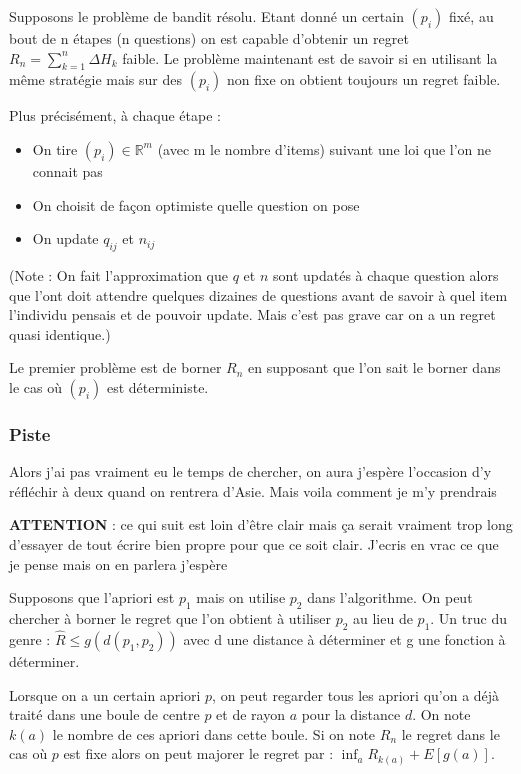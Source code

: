 \documentclass[12pt]{article}
\begin{document}
\vspace{2mm}
Supposons le problème de bandit résolu. Etant donné un certain $(p_i)$ fixé, au bout de n étapes (n questions) on est capable d'obtenir un regret $R_n = \sum_{k=1}^n \Delta H_k$ faible. Le problème maintenant est de savoir si en utilisant la même stratégie mais sur des $(p_i)$ non fixe on obtient toujours un regret faible. 

\vspace{2mm}
Plus précisément, à chaque étape : 
\begin{itemize}
	\item On tire $(p_i) \in \mathbb{R}^m$ (avec m le nombre d'items) suivant une loi que l'on ne connait pas
	\item On choisit de façon optimiste quelle question on pose
	\item On update $q_{ij}$ et $n_{ij}$
\end{itemize}
(Note : On fait l'approximation que $q$ et $n$ sont updatés à chaque question alors que l'ont doit attendre quelques dizaines de questions avant de savoir à quel item l'individu pensais et de pouvoir update. Mais c'est pas grave car on a un regret quasi identique.)

Le premier problème est de borner $R_n$ en supposant que l'on sait le borner dans le cas où $(p_i)$ est déterministe. 

\subsubsection{Piste}
Alors j'ai pas vraiment eu le temps de chercher, on aura j'espère l'occasion d'y réfléchir à deux quand on rentrera d'Asie. Mais voila comment je m'y prendrais 

\vspace{3mm}
\textbf{ATTENTION} : ce qui suit est loin d'être clair mais ça serait vraiment trop long d'essayer de tout écrire bien propre pour que ce soit clair. J'ecris en vrac ce que je pense mais on en parlera j'espère
\vspace{3mm}

Supposons que l'apriori est $p_1$ mais on utilise $p_2$ dans l'algorithme. On peut chercher à borner le regret que l'on obtient à utiliser $p_2$ au lieu de $p_1$. Un truc du genre : $\hat{R} \le g(d(p_1, p_2))$ avec d une distance à déterminer et g une  fonction à déterminer. 

Lorsque on a un certain apriori $p$, on peut regarder tous les apriori qu'on a déjà traité dans une boule de centre $p$ et de rayon $a$ pour la distance $d$. On note $k(a)$ le nombre de ces apriori dans cette boule. Si on note $R_n$ le regret dans le cas où $p$ est fixe alors on peut majorer le regret par : $\inf_a R_{k(a)} + E[g(a)]$. 
\end{document}
